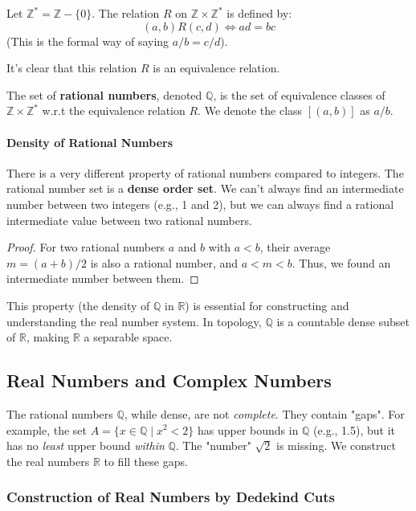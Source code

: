 \begin{definition}
Let $\mathbb{Z}^* = \mathbb{Z} - \{0\}$. The relation $R$ on $\mathbb{Z} \times \mathbb{Z}^*$ is defined by:
$$ (a,b) R (c,d) \iff ad = bc $$
(This is the formal way of saying $a/b = c/d$).
\end{definition}
It’s clear that this relation $R$ is an equivalence relation.

\begin{definition}
The set of \textbf{rational numbers}, denoted $\mathbb{Q}$, is the set of equivalence classes of $\mathbb{Z} \times \mathbb{Z}^*$ w.r.t the equivalence relation $R$. We denote the class $[(a,b)]$ as $a/b$.
\end{definition}

\paragraph{Density of Rational Numbers}
There is a very different property of rational numbers compared to integers. The rational number set is a \textbf{dense order set}. We can’t always find an intermediate number between two integers (e.g., 1 and 2), but we can always find a rational intermediate value between two rational numbers.
\begin{proof}
For two rational numbers $a$ and $b$ with $a < b$, their average $m = (a+b)/2$ is also a rational number, and $a < m < b$. Thus, we found an intermediate number between them.
\end{proof}
This property (the density of $\mathbb{Q}$ in $\mathbb{R}$) is essential for constructing and understanding the real number system. In topology, $\mathbb{Q}$ is a countable dense subset of $\mathbb{R}$, making $\mathbb{R}$ a separable space.

\subsection{Real Numbers and Complex Numbers}
The rational numbers $\mathbb{Q}$, while dense, are not \emph{complete}. They contain "gaps". For example, the set $A = \{ x \in \mathbb{Q} \mid x^2 < 2 \}$ has upper bounds in $\mathbb{Q}$ (e.g., 1.5), but it has no \emph{least} upper bound \emph{within} $\mathbb{Q}$. The "number" $\sqrt{2}$ is missing. We construct the real numbers $\mathbb{R}$ to fill these gaps.

\subsubsection{Construction of Real Numbers by Dedekind Cuts}

